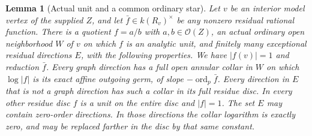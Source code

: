 \documentclass[11pt]{article}
\newtheorem{lemma}[theorem]{Lemma}
\newcommand{\ord}{\operatorname{ord}}
\begin{document}
\begin{lemma}[Actual unit and a common ordinary star]\label{lem:star}
Let $v$ be an interior model vertex of the supplied $Z$, and let
$\bar f\in k(R_v)^\times$ be any nonzero residual rational function.
There is a quotient $f=a/b$ with $a,b\in\mathcal{O}(Z)$, an actual
ordinary open neighborhood $W$ of $v$ on which $f$ is an analytic
unit, and finitely many exceptional residual directions $E$, with
the following properties. We have $|f(v)|=1$ and reduction $\bar f$.
Every graph direction has a full open annular collar in $W$ on
which $\log|f|$ is its exact affine outgoing germ, of slope
$-\ord_p\bar f$. Every direction in $E$ that is not a graph
direction has such a collar in its full residue disc. In every
other residue disc $f$ is a unit on the entire disc and $|f|=1$.
The set $E$ may contain zero-order directions. In those directions
the collar logarithm is exactly zero, and may be replaced farther
in the disc by that same constant.
\end{lemma}
\end{document}
